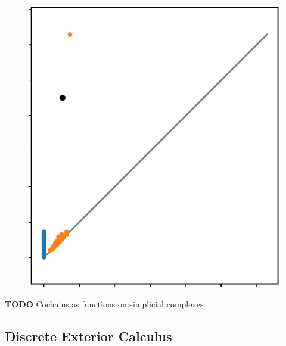 \begin{figure}[htbp]
  \includegraphics[scale=0.5]{figures/circular_dgm2.pdf}
   \caption{}
   \label{fig:circular}
\end{figure}

\vspace{0.25in}
\textbf{TODO} Cochains as functions on simplicial complexes
\vspace{0.25in}

\subsection{Discrete Exterior Calculus}

